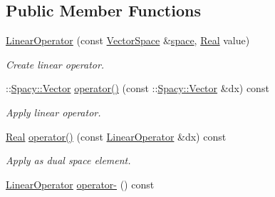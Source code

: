 \subsection*{Public Member Functions}
\begin{DoxyCompactItemize}
\item 
\hypertarget{structSpacy_1_1Scalar_1_1LinearOperator_af0bc3f5ddf91225b3add5e9e783f00d1}{\hyperlink{structSpacy_1_1Scalar_1_1LinearOperator_af0bc3f5ddf91225b3add5e9e783f00d1}{Linear\-Operator} (const \hyperlink{classSpacy_1_1VectorSpace}{Vector\-Space} \&\hyperlink{classSpacy_1_1VectorBase_aa999dbf9d679d895dfe04c10fbf9f5e9}{space}, \hyperlink{classSpacy_1_1Real}{Real} value)}\label{structSpacy_1_1Scalar_1_1LinearOperator_af0bc3f5ddf91225b3add5e9e783f00d1}

\begin{DoxyCompactList}\small\item\em Create linear operator. \end{DoxyCompactList}\item 
\hypertarget{structSpacy_1_1Scalar_1_1LinearOperator_aa978b12a9e892a6929487c8da259d4af}{\-::\hyperlink{classSpacy_1_1Vector}{Spacy\-::\-Vector} \hyperlink{structSpacy_1_1Scalar_1_1LinearOperator_aa978b12a9e892a6929487c8da259d4af}{operator()} (const \-::\hyperlink{classSpacy_1_1Vector}{Spacy\-::\-Vector} \&dx) const }\label{structSpacy_1_1Scalar_1_1LinearOperator_aa978b12a9e892a6929487c8da259d4af}

\begin{DoxyCompactList}\small\item\em Apply linear operator. \end{DoxyCompactList}\item 
\hypertarget{structSpacy_1_1Scalar_1_1LinearOperator_a18bb352947b03ea528a19089e4782320}{\hyperlink{classSpacy_1_1Real}{Real} \hyperlink{structSpacy_1_1Scalar_1_1LinearOperator_a18bb352947b03ea528a19089e4782320}{operator()} (const \hyperlink{structSpacy_1_1Scalar_1_1LinearOperator}{Linear\-Operator} \&dx) const }\label{structSpacy_1_1Scalar_1_1LinearOperator_a18bb352947b03ea528a19089e4782320}

\begin{DoxyCompactList}\small\item\em Apply as dual space element. \end{DoxyCompactList}\item 
\hypertarget{structSpacy_1_1Scalar_1_1LinearOperator_aba7eb546eca4983adcf2e39155af07d1}{\hyperlink{structSpacy_1_1Scalar_1_1LinearOperator}{Linear\-Operator} \hyperlink{structSpacy_1_1Scalar_1_1LinearOperator_aba7eb546eca4983adcf2e39155af07d1}{operator-\/} () const }\label{structSpacy_1_1Scalar_1_1LinearOperator_aba7eb546eca4983adcf2e39155af07d1}


\end{DoxyCompactItemize}
